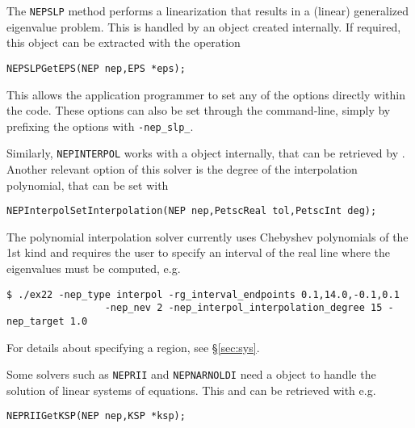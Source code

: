 The \texttt{NEPSLP} method performs a linearization that results in a (linear) generalized eigenvalue problem. This is handled by an  object created internally. If required, this  object can be extracted with the operation
	\begin{Verbatim}[fontsize=\small]
	NEPSLPGetEPS(NEP nep,EPS *eps);
	\end{Verbatim}
This allows the application programmer to set any of the  options directly within the code. These options can also be set through the command-line, simply by prefixing the  options with \texttt{-nep\_slp\_}.

Similarly, \texttt{NEPINTERPOL} works with a  object internally, that can be retrieved by . Another relevant option of this solver is the degree of the interpolation polynomial, that can be set with
	\begin{Verbatim}[fontsize=\small]
	NEPInterpolSetInterpolation(NEP nep,PetscReal tol,PetscInt deg);
	\end{Verbatim}
The polynomial interpolation solver currently uses Chebyshev polynomials of the 1st kind and requires the user to specify an interval of the real line where the eigenvalues must be computed, e.g.
\begin{Verbatim}[fontsize=\small]
	$ ./ex22 -nep_type interpol -rg_interval_endpoints 0.1,14.0,-0.1,0.1
                 -nep_nev 2 -nep_interpol_interpolation_degree 15 -nep_target 1.0
\end{Verbatim}
For details about specifying a region, see \S\ref{sec:sys}.

Some solvers such as \texttt{NEPRII} and \texttt{NEPNARNOLDI} need a  object to handle the solution of linear systems of equations. This  and can be retrieved with e.g.
	\begin{Verbatim}[fontsize=\small]
	NEPRIIGetKSP(NEP nep,KSP *ksp);
	\end{Verbatim}

